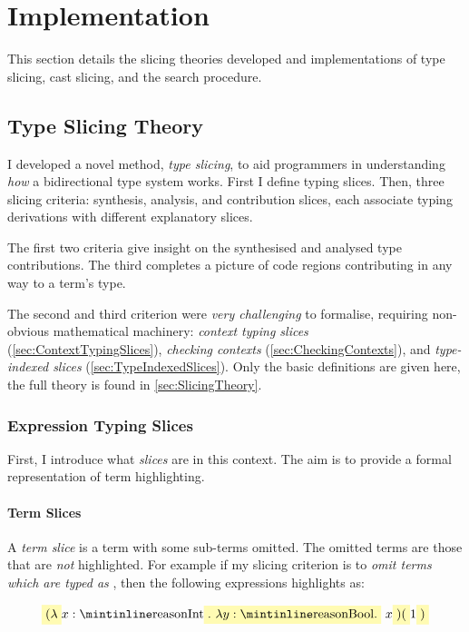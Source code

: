 \chapter{Implementation}\label{chap:Implementation}
This section details the slicing theories developed and implementations of type slicing, cast slicing, and the search procedure.

\section{Type Slicing Theory}\label{sec:TypeSlicingTheory}
I developed a novel method, \textit{type slicing}, to aid programmers in understanding \textit{how} a bidirectional type system works. First I define typing slices. Then, three slicing criteria: synthesis, analysis, and contribution slices, each associate typing derivations with different explanatory slices. 

The first two criteria give insight on the synthesised and analysed type contributions. The third completes a picture of code regions contributing in any way to a term's type.

The second and third criterion were \textit{very challenging} to formalise, requiring non-obvious mathematical machinery: \textit{context typing slices} (\cref{sec:ContextTypingSlices}), \textit{checking contexts} (\cref{sec:CheckingContexts}), and \textit{type-indexed slices} (\cref{sec:TypeIndexedSlices}). Only the basic definitions are given here, the full theory is found in \cref{sec:SlicingTheory}.

\subsection{Expression Typing Slices}\label{sec:ExpressionTypingSlices}
First, I introduce what \textit{slices} are in this context. The aim is to provide a formal representation of term highlighting. 

\subsubsection{Term Slices}
A \textit{term slice} is a term with some sub-terms omitted. The omitted terms are those that are \textit{not} highlighted. For example if my slicing criterion is to \textit{omit terms which are typed as} , then the following expressions highlights as:

\[\hlcmaths[yellow!30]{(\lambda} x: \code{Int}\hlcmaths[yellow!30]{.\ \lambda y : \code{Bool}.}\ x\hlcmaths[yellow!30]{)(}1\hlcmaths[yellow!30]{)}\]



